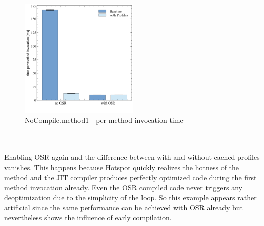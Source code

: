 \begin{figure}[ht]
  \begin{center}
    \centering
    \includegraphics[width=0.5\textwidth]{figures/nocompile.png}
    \caption{NoCompile.method1 - per method invocation time}
    \label{f:nocompile}
  \end{center}
\end{figure}
\\\\
Enabling OSR again and the difference between with and without cached profiles vanishes.
This happens because Hotspot quickly realizes the hotness of the method and the JIT compiler produces perfectly optimized code during the first method invocation already. 
Even the OSR compiled code never triggers any deoptimization due to the simplicity of the loop.
So this example appears rather artificial since the same performance can be achieved with OSR already but nevertheless shows the influence of early compilation.
